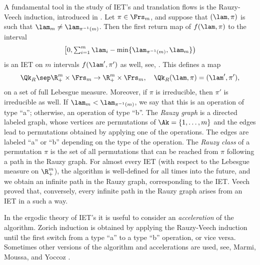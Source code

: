  \label{subsec-Rauzy}
A fundamental tool in the study of IET's and translation flows is the Rauzy-Veech induction, introduced in \cite{Veech0,Rauzy}.
Let $\pi\in \Frs_m$, and suppose that $(\lam,\pi)$ is such that $\lam_m \ne \lam_{\pi^{-1}(m)}$. Then the first return map of $f(\lam,\pi)$ to the interval
\[\textstyle
\bigl[0, \sum_{i=1}^m \lam_i - \min\{\lam_{\pi^{-1}(m)},\lam_m\} \bigr)
\]
is an IET on $m$ intervals $f(\lam',\pi')$ as well, see, \eg \cite{viana2,yoccoz}. This defines a map
\[
\Qk_R\sep \R^m_+\times \Frs_m \to \R^m_+\times \Frs_m,\quad \Qk_R(\lam,\pi) = (\lam',\pi'),
\]
on a set of full Lebesgue measure. Moreover, if $\pi$ is irreducible, then $\pi'$ is irreducible as well.
If $\lam_m < \lam_{\pi^{-1}(m)}$, we say that this is an operation of type ``a''; otherwise, an operation of type ``b''. The \emph{Rauzy graph} is a directed labeled graph, whose vertices are permutations of $\Ak=\{1,\ldots,m\}$ and the edges lead to permutations obtained by applying one of the operations. The edges are labeled ``a'' or ``b'' depending on the type of the operation. The \emph{Rauzy class} of a permutation $\pi$ is the set of all permutations that can be reached from $\pi$ following a path in the Rauzy graph. For almost every IET (with respect to the Lebesgue measure on $\R^m_+$), the algorithm is well-defined for all times into the future, and we obtain an infinite path in the Rauzy graph, corresponding to the IET. Veech \cite{veech} proved that, conversely, every infinite path in the Rauzy graph arises from an IET in a such a way.

In the ergodic theory of IET's it is useful to consider an \emph{acceleration} of the algorithm. Zorich induction \cite{Zorich,Zorich1} is obtained by applying the Rauzy-Veech induction until the first switch from a type ``a'' to a type ``b'' operation, or vice versa.
Sometimes other versions of the algorithm and accelerations are used, see, \eg Marmi, Moussa, and Yoccoz \cite{MMY}.

